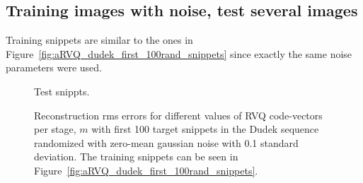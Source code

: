\clearpage
\newpage
\subsection{Training images with noise, test several images}
Training snippets are similar to the ones in Figure~\ref{fig:aRVQ_dudek_first_100rand_snippets} since exactly the same noise parameters were used.


								\begin{figure}[h]
								\centering
								\caption{Test snippts.}
								\label{fig:aRVQ_Dudek_first_100_rand}
								\end{figure}


								\begin{figure}[h]
								\centering
								\subtable{\begin{tiny}\end{tiny}}
								\caption{Reconstruction rms errors for different values of RVQ code-vectors per stage, $m$ with first 100 target snippets in the Dudek sequence randomized with zero-mean gaussian noise with 0.1 standard deviation.  The training snippets can be seen in Figure~\ref{fig:aRVQ_dudek_first_100rand_snippets}.}
								\label{fig:aRVQ_Dudek_first_100_rand}
								\end{figure}


\clearpage
\newpage
\normalsize





